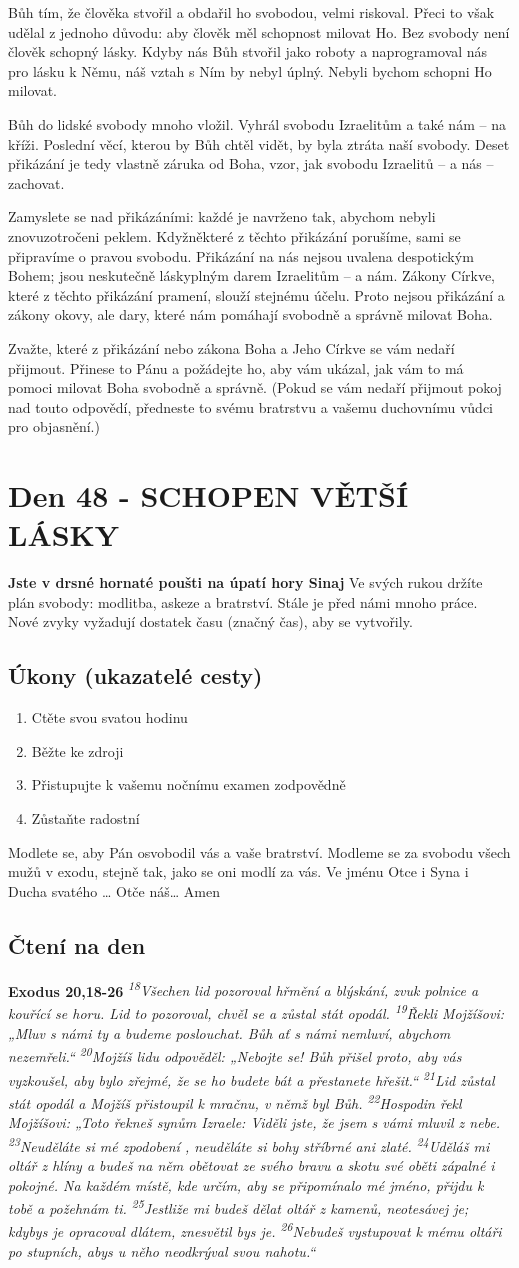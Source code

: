 \documentclass[11pt]{article}
\newcommand{\zacatekSedmyTyden}{
  \textbf{Jste v drsné hornaté poušti na úpatí hory Sinaj} \newline 
  Ve svých rukou držíte plán svobody: modlitba, askeze a bratrství. Stále je před námi mnoho práce. Nové zvyky vyžadují dostatek času (značný čas), aby se vytvořily.

  \subsection*{Úkony (ukazatelé cesty)}
\begin{enumerate}
  \item Ctěte svou svatou hodinu
  \item Běžte ke zdroji
  \item Přistupujte k vašemu nočnímu examen zodpovědně
  \item Zůstaňte radostní
\end{enumerate}
Modlete se, aby Pán osvobodil vás a vaše bratrství. \newline
Modleme se za svobodu všech mužů v exodu, stejně tak, jako se oni modlí za vás.\newline
Ve jménu Otce i Syna i Ducha svatého …  Otče náš… Amen
}
\begin{document}
Bůh tím, že člověka stvořil a obdařil ho svobodou, velmi riskoval. Přeci to však udělal z jednoho důvodu: aby
člověk měl schopnost milovat Ho. Bez svobody není člověk schopný lásky. Kdyby nás Bůh stvořil jako roboty
a naprogramoval nás pro lásku k Němu, náš vztah s Ním by nebyl úplný. Nebyli bychom schopni Ho milovat.

Bůh do lidské svobody mnoho vložil. Vyhrál svobodu Izraelitům a také nám – na kříži. Poslední věcí, kterou
by Bůh chtěl vidět, by byla ztráta naší svobody. Deset přikázání je tedy vlastně záruka od Boha, vzor, jak
svobodu Izraelitů – a nás – zachovat.

Zamyslete se nad přikázáními: každé je navrženo tak, abychom nebyli znovuzotročeni peklem. Kdyžněkteré
z těchto přikázání porušíme, sami se připravíme o pravou svobodu. Přikázání na nás nejsou uvalena
despotickým Bohem; jsou neskutečně láskyplným darem Izraelitům – a nám. Zákony Církve, které z těchto
přikázání pramení, slouží stejnému účelu. Proto nejsou přikázání a zákony okovy, ale dary, které nám pomáhají
svobodně a správně milovat Boha.

Zvažte, které z přikázání nebo zákona Boha a Jeho Církve se vám nedaří přijmout. Přinese to Pánu a požádejte
ho, aby vám ukázal, jak vám to má pomoci milovat Boha svobodně a správně. (Pokud se vám nedaří přijmout
pokoj nad touto odpovědí, předneste to svému bratrstvu a vašemu duchovnímu vůdci pro objasnění.)


\newpage
\section{Den 48 - SCHOPEN VĚTŠÍ LÁSKY }
\zacatekSedmyTyden
\subsection*{Čtení na den}
\textbf{Exodus 20,18-26}
\newline
\textit{
\textsuperscript{18}Všechen lid pozoroval hřmění a blýskání, zvuk polnice a kouřící se horu. Lid to pozoroval, chvěl se a zůstal stát opodál.
\textsuperscript{19}Řekli Mojžíšovi: „Mluv s námi ty a budeme poslouchat. Bůh ať s námi nemluví, abychom nezemřeli.“
\textsuperscript{20}Mojžíš lidu odpověděl: „Nebojte se! Bůh přišel proto, aby vás vyzkoušel, aby bylo zřejmé, že se ho budete bát a přestanete hřešit.“
\textsuperscript{21}Lid zůstal stát opodál a Mojžíš přistoupil k mračnu, v němž byl Bůh.
\textsuperscript{22}Hospodin řekl Mojžíšovi: „Toto řekneš synům Izraele: Viděli jste, že jsem s vámi mluvil z nebe.
\textsuperscript{23}Neuděláte si mé zpodobení , neuděláte si bohy stříbrné ani zlaté.
\textsuperscript{24}Uděláš mi oltář z hlíny a budeš na něm obětovat ze svého bravu a skotu své oběti zápalné i pokojné. Na každém místě, kde určím, aby se připomínalo mé jméno, přijdu k tobě a požehnám ti.
\textsuperscript{25}Jestliže mi budeš dělat oltář z kamenů, neotesávej je; kdybys je opracoval dlátem, znesvětil bys je.
\textsuperscript{26}Nebudeš vystupovat k mému oltáři po stupních, abys u něho neodkrýval svou nahotu.“
}
\end{document}
